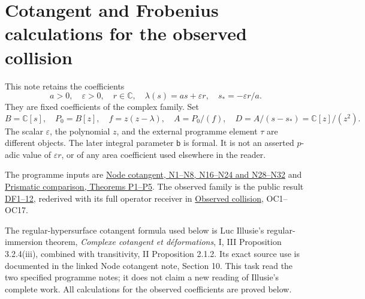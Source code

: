 \documentclass[
]{article}
\author{}
\date{}
\begin{document}
{
\setcounter{tocdepth}{3}
\tableofcontents
}
\section{Cotangent and Frobenius calculations for the observed
collision}\label{cotangent-and-frobenius-calculations-for-the-observed-collision}

This note retains the coefficients \[
a>0,\quad\varepsilon>0,\quad r\in\mathbb C,\quad
\lambda(s)=as+\varepsilon r,\quad s_*=-\varepsilon r/a.
\tag{OCF1}
\] They are fixed coefficients of the complex family. Set \[
B=\mathbb C[s],\quad P_0=B[z],\quad
f=z(z-\lambda),\quad A=P_0/(f),\quad
D=A/(s-s_*)=\mathbb C[z]/(z^2).
\tag{OCF2}
\] The scalar \(\varepsilon\), the polynomial \(z\), and the external
programme element \(\tau\) are different objects. The later integral
parameter \(\mathsf b\) is formal. It is not an asserted \(p\)-adic
value of \(\varepsilon r\), or of any area coefficient used elsewhere in
the reader.

The programme inputs are
\href{https://github.com/KokunoYumeto/zeta-function-research-reader/blob/6af54ea3c8ef99127af327f3103e086c68d482c2/workbenches/splitzero-tandem/branches/identity-absorber-square/NODE_COTANGENT.md}{Node
cotangent, N1--N8, N16--N24 and N28--N32} and
\href{https://github.com/KokunoYumeto/zeta-function-research-reader/blob/6af54ea3c8ef99127af327f3103e086c68d482c2/workbenches/splitzero-tandem/branches/identity-absorber-square/PRISMATIC_COMPARISON.md}{Prismatic
comparison, Theorems P1--P5}. The observed family is the public result
\href{https://github.com/KokunoYumeto/zeta-function-research-reader/blob/4ba9285b66af58a6d58fc502a494c1fb45ca5b79/workbenches/splitzero-tandem/continuations/20260922-support-transport/OBSERVED_DEFORMATION_AND_CURRENT.md\#L22}{DF1--12},
rederived with its full operator receiver in
\href{https://github.com/KokunoYumeto/zeta-function-research-reader/blob/c9df443d9e1df000dfbb083943f97197e746eb08/workbenches/splitzero-tandem/branches/identity-absorber-square/OBSERVED_COLLISION.md}{Observed
collision}, OC1--OC17.

The regular-hypersurface cotangent formula used below is Luc Illusie's
regular-immersion theorem, \emph{Complexe cotangent et déformations}, I,
III Proposition 3.2.4(iii), combined with transitivity, II Proposition
2.1.2. Its exact source use is documented in the linked Node cotangent
note, Section 10. This task read the two specified programme notes; it
does not claim a new reading of Illusie's complete work. All
calculations for the observed coefficients are proved below.
\end{document}
